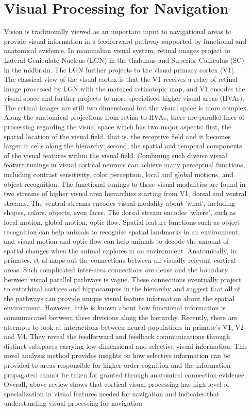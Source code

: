 \section{Visual Processing for Navigation}
Vision is traditionally viewed as an important input to navigational areas to provide visual information in a feedforward pathway supported by functional and anatomical evidence. In mammalian visual system,  retinal images project to Lateral Geniculate Nucleus (LGN) in the thalamus and Superior Colliculus (SC) in the midbrain. The LGN further projects to the visual primary cortex (V1). The classical view of the visual cortex is that the V1 receives a relay of retinal image processed by LGN with the matched retinotopic map, and V1 encodes the visual space and further projects to more specialised higher visual areas (HVAs). The retinal images are still two dimensional but the visual space is more complex. Along the anatomical projections from retina to HVAs, there are parallel lines of processing regarding the visual space which has two major aspects: first, the spatial location of the visual field, that is, the receptive field and it becomes larger in cells along the hierarchy; second, the spatial and temporal components of the visual features within the visual field. Combining such diverse visual feature tunings in visual cortical neurons can achieve many perceptual functions, including contrast sensitivity, color perception, local and global motions, and object recognition. The functional tunings to these visual modalities are found in two streams of higher visual area hierarchies starting from V1, dorsal and ventral streams. The ventral streams encodes visual modality about 'what', including shapes, colors, objects, even faces. The dorsal stream encodes 'where', such as local motion, global motion, optic flow. Spatial feature functions such as object recognition can help animals to recognise spatial landmarks in an environment, and visual motion and optic flow can help animals to decode the amount of spatial changes when the animal explores in an environment. Anatomically, in primates, et al maps out the connections between all visually relevant cortical areas. Such complicated inter-area connections are dense and the boundary between visual parallel pathways is vague. These connections eventually project to entorhinal cortices and hippocampus in the hierarchy and suggest that all of the pathways can provide unique visual feature information about the spatial environment. However, little is known about how functional information is communicated between these divisions along the hierarchy. Recently, there are attempts to look at interactions between neural populations in primate's V1, V2 and V4. They reveal the feedforward and feedback communications through distinct subspaces carrying low-dimensional and selective visual information. This novel analysis method provides insights on how selective information can be provided to areas responsible for higher-order cognition and the information propagated cannot be taken for granted through anatomical connection evidence. Overall, above review shows that cortical visual processing has high-level of specialization in visual features needed for navigation and indicates that understanding visual processing for navigation 